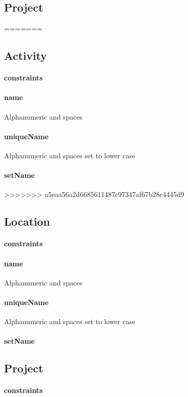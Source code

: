 \documentclass[12pt]{article}
\begin{document}
\subsection{Project}
=======
\setcounter{paragraph}{0}
\subsection{Activity}
\paragraph{constraints}
\paragraph{name} Alphanumeric and spaces 
\paragraph{uniqueName} Alphanumeric and spaces  set to lower case
\paragraph{setName}

\setcounter{paragraph}{0}
>>>>>>> a5eaa56a2d6685611487c97347af67b28c4445d9
\subsection{Location}
\paragraph{constraints}
\paragraph{name} Alphanumeric and spaces 
\paragraph{uniqueName} Alphanumeric and spaces  set to lower case
\paragraph{setName}

\setcounter{paragraph}{0}
\subsection{Project}
\paragraph{constraints}
\end{document}

